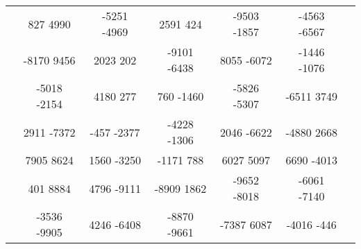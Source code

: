 \begin{landscape}
\begin{table}[]
\begin{tabular}{|c|ccccc|c|}
				 & 827 4990 & -5251 -4969 & 2591 424 & -9503 -1857 & -4563 -6567 & 		 \\
				 & -8170 9456 & 2023 202 & -9101 -6438 & 8055 -6072 & -1446 -1076 & 		 \\
				 & -5018 -2154 & 4180 277 & 760 -1460 & -5826 -5307 & -6511 3749 & 		 \\
				 & 2911 -7372 & -457 -2377 & -4228 -1306 & 2046 -6622 & -4880 2668 & 		 \\
				 & 7905 8624 & 1560 -3250 & -1171 788 & 6027 5097 & 6690 -4013 & 		 \\
				 & 401 8884 & 4796 -9111 & -8909 1862 & -9652 -8018 & -6061 -7140 & 		 \\
				 & -3536 -9905 & 4246 -6408 & -8870 -9661 & -7387 6087 & -4016 -446 & 		 \\ \hline
		\end{tabular}
	\end{table}
\end {landscape}

